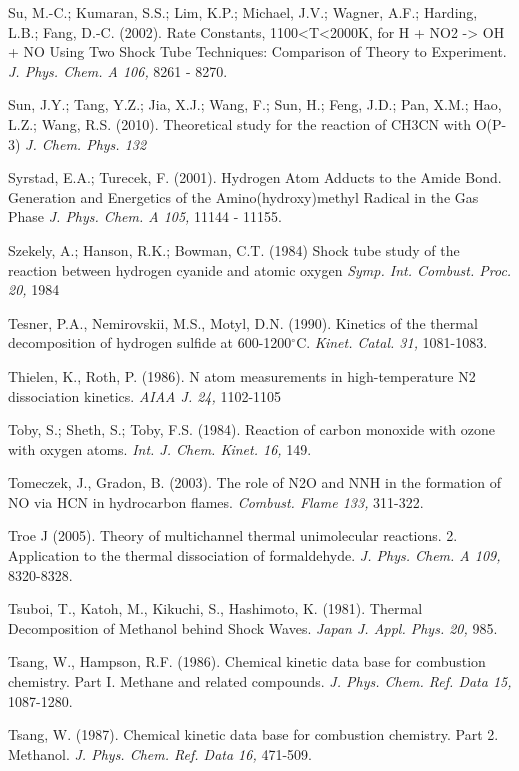 \documentclass[12pt,landscape]{article}
\newcounter{reaction}
\begin{document}
Su, M.-C.; Kumaran, S.S.; Lim, K.P.; Michael, J.V.; Wagner, A.F.; Harding, L.B.; Fang, D.-C. (2002).   
Rate Constants, 1100<T<2000K, for H + NO2 -> OH + NO Using Two Shock Tube Techniques: Comparison of Theory to Experiment.  
{\em J. Phys. Chem. A   106,} 8261 - 8270.

 Sun, J.Y.; Tang, Y.Z.; Jia, X.J.; Wang, F.; Sun, H.; Feng, J.D.; Pan, X.M.; Hao, L.Z.; Wang, R.S. (2010).
Theoretical study for the reaction of CH3CN with O(P-3)
{\em J. Chem. Phys. 132}

Syrstad, E.A.; Turecek, F. (2001).
Hydrogen Atom Adducts to the Amide Bond. Generation and Energetics of the Amino(hydroxy)methyl Radical in the Gas Phase
{\em J. Phys. Chem. A 105,} 11144 - 11155.

Szekely, A.; Hanson, R.K.; Bowman, C.T. (1984)
Shock tube study of the reaction between hydrogen cyanide and atomic oxygen
{\em Symp. Int. Combust. Proc.  20,} 1984

Tesner, P.A., Nemirovskii, M.S., Motyl, D.N. (1990). Kinetics of the thermal decomposition of hydrogen sulfide at 600-1200$^{\circ}$C.  {\em Kinet. Catal. 31,} 1081-1083.

Thielen, K., Roth, P. (1986).  N atom measurements in high-temperature N2 dissociation kinetics. {\em AIAA J.  24,} 1102-1105

Toby, S.; Sheth, S.; Toby, F.S. (1984).  Reaction of carbon monoxide with ozone with oxygen atoms. {\em Int. J. Chem. Kinet. 16,} 149.

Tomeczek, J., Gradon, B. (2003). The role of N2O and NNH in the formation of NO via HCN in hydrocarbon flames. {\em  Combust. Flame 133,} 311-322.

Troe J (2005). Theory of multichannel thermal unimolecular reactions. 2. Application to the thermal dissociation of formaldehyde. {\em J. Phys. Chem. A 109,} 8320-8328.

Tsuboi, T., Katoh, M., Kikuchi, S., Hashimoto, K. (1981). Thermal Decomposition of Methanol behind Shock Waves.  {\em Japan J. Appl. Phys. 20,} 985.

Tsang, W., Hampson, R.F. (1986). Chemical kinetic data base for combustion chemistry. Part I. Methane and related compounds.  {\em J. Phys. Chem. Ref. Data 15,} 1087-1280.

Tsang, W. (1987).  Chemical kinetic data base for combustion chemistry. Part 2. Methanol.  {\em J. Phys. Chem. Ref. Data 16,} 471-509.
\end{document}
